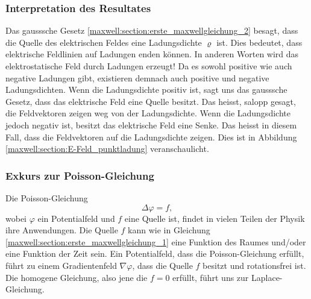 \subsubsection{Interpretation des Resultates}
Das gausssche Gesetz \eqref{maxwell:section:erste_maxwellgleichung_2} besagt, dass die Quelle des elektrischen Feldes eine Ladungsdichte $\varrho$ ist.
Dies bedeutet, dass elektrische Feldlinien auf Ladungen enden können.
In anderen Worten wird das elektrostatische Feld durch Ladungen erzeugt!
Da es sowohl positive wie auch negative Ladungen gibt, existieren demnach auch positive und negative Ladungsdichten.
Wenn die Ladungsdichte positiv ist, sagt uns das gausssche Gesetz, dass das elektrische Feld eine Quelle besitzt.
Das heisst, salopp gesagt, die Feldvektoren zeigen weg von der Ladungsdichte.
Wenn die Ladungsdichte jedoch negativ ist, besitzt das elektrische Feld eine Senke.
Das heisst in diesem Fall, dass die Feldvektoren auf die Ladungsdichte zeigen. Dies ist in Abbildung \ref{maxwell:section:E-Feld_punktladung} veranschaulicht.

\subsubsection{Exkurs zur Poisson-Gleichung}
%
Die Poisson-Gleichung
\[
\Delta\varphi
=
f,
\]
wobei $\varphi$ ein Potentialfeld und $f$ eine Quelle ist, findet in vielen Teilen der Physik ihre Anwendungen.
Die Quelle $f$ kann wie in Gleichung \eqref{maxwell:section:erste_maxwellgleichung_1} eine Funktion des Raumes und/oder eine Funktion der Zeit sein.
Ein Potentialfeld, dass die Poisson-Gleichung erfüllt, führt zu einem Gradientenfeld $\nabla\varphi$, dass die Quelle $f$ besitzt und rotationsfrei ist.
Die homogene Gleichung, also jene die $f = 0$ erfüllt, führt uns zur Laplace-Gleichung.







